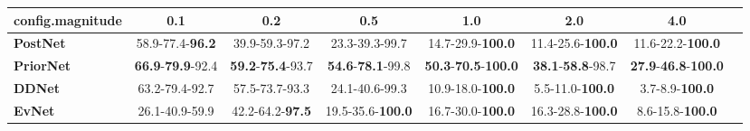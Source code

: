 \begin{tabular}{lccccccc}
\toprule
\textbf{config.magnitude} &                               0.1 &                               0.2 &                               0.5 &                                         1.0 &                               2.0 &                                         4.0 \\
\midrule
\textbf{PostNet } &           58.9-77.4-\textbf{96.2} &                    39.9-59.3-97.2 &                    23.3-39.3-99.7 &                    14.7-29.9-\textbf{100.0} &          11.4-25.6-\textbf{100.0} &                    11.6-22.2-\textbf{100.0} \\
\textbf{PriorNet} &  \textbf{66.9}-\textbf{79.9}-92.4 &  \textbf{59.2}-\textbf{75.4}-93.7 &  \textbf{54.6}-\textbf{78.1}-99.8 &  \textbf{50.3}-\textbf{70.5}-\textbf{100.0} &  \textbf{38.1}-\textbf{58.8}-98.7 &  \textbf{27.9}-\textbf{46.8}-\textbf{100.0} \\
\textbf{DDNet   } &                    63.2-79.4-92.7 &                    57.5-73.7-93.3 &                    24.1-40.6-99.3 &                    10.9-18.0-\textbf{100.0} &           5.5-11.0-\textbf{100.0} &                      3.7-8.9-\textbf{100.0} \\
\textbf{EvNet   } &                    26.1-40.9-59.9 &           42.2-64.2-\textbf{97.5} &          19.5-35.6-\textbf{100.0} &                    16.7-30.0-\textbf{100.0} &          16.3-28.8-\textbf{100.0} &                     8.6-15.8-\textbf{100.0} \\
\bottomrule
\end{tabular}
